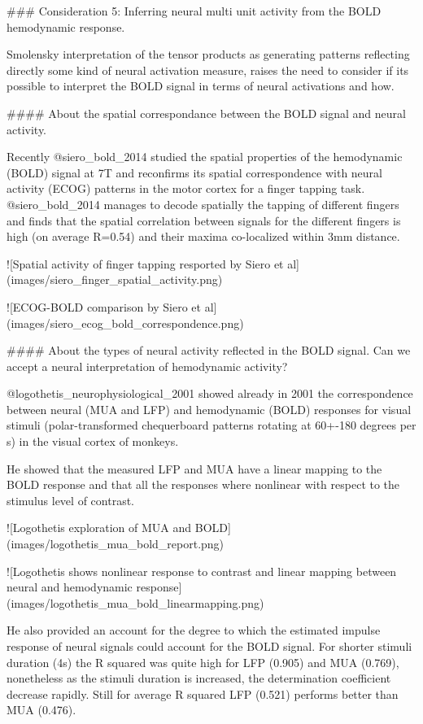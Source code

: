 ### Consideration 5: Inferring neural multi unit activity from the BOLD hemodynamic response.

Smolensky interpretation of the tensor products as generating patterns reflecting directly some kind of neural activation measure, raises the need to consider if its possible to interpret the BOLD signal in terms of neural activations and how.

#### About the spatial correspondance between the BOLD signal and neural activity.  

Recently @siero_bold_2014 studied the spatial properties of the hemodynamic (BOLD) signal at 7T and reconfirms its spatial correspondence with neural activity (ECOG) patterns in the motor cortex for a finger tapping task. @siero_bold_2014 manages to decode spatially the tapping of different fingers and finds that the spatial correlation between signals for the different fingers is high (on average R=0.54) and their maxima co-localized within 3mm distance.

![Spatial activity of finger tapping resported by Siero et al](images/siero_finger_spatial_activity.png)

![ECOG-BOLD comparison by Siero et al](images/siero_ecog_bold_correspondence.png)

#### About the types of neural activity reflected in the BOLD signal. Can we accept a neural interpretation of hemodynamic activity?

@logothetis_neurophysiological_2001 showed already in 2001 the correspondence between neural (MUA and LFP) and hemodynamic (BOLD) responses for visual stimuli (polar-transformed chequerboard patterns rotating at 60+-180 degrees per s) in the visual cortex of monkeys.

He showed that the measured LFP and MUA have a linear mapping to the BOLD  response and that all the responses where nonlinear with respect to the  stimulus level of contrast.

![Logothetis exploration of MUA and BOLD](images/logothetis_mua_bold_report.png)

![Logothetis shows nonlinear response to contrast and linear mapping between neural and hemodynamic response](images/logothetis_mua_bold_linearmapping.png)

He also provided an account for the degree to  which the estimated impulse response of neural signals could account for the  BOLD signal. For shorter stimuli duration (4s) the R squared was quite high for LFP  (0.905) and MUA (0.769), nonetheless as the stimuli duration is increased, the determination coefficient decrease rapidly. Still for average R squared LFP (0.521) performs better than MUA (0.476).

